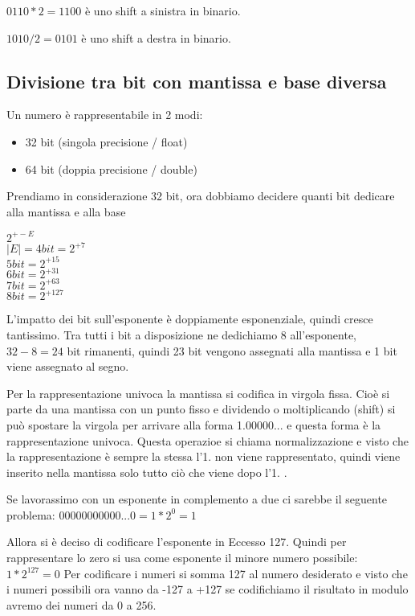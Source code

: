 \documentclass[a4paper]{article}
\theoremstyle{break}
\theoremstyle{break}
\theoremstyle{break}
\theoremstyle{break}
\theoremstyle{break}
\begin{document}
\(0110 * 2 = 1100\) è uno shift a sinistra in binario.

\(1010/2 = 0101\) è uno shift a destra in binario.

\subsection{Divisione tra bit con mantissa e base diversa}
Un numero è rappresentabile in 2 modi:
\begin{itemize}
	\item 32 bit (singola precisione / float)
	\item 64 bit (doppia precisione / double)
\end{itemize}

Prendiamo in considerazione 32 bit, ora dobbiamo decidere quanti bit dedicare alla
mantissa e alla base

$2^{+-E}$\\
$|E| = 4 bit = 2^{+7}$\\
$5 bit = 2^{+15}$\\
$6 bit = 2^{+31}$\\
$7 bit = 2^{+63}$\\
$8 bit = 2^{+127}$

L'impatto dei bit sull'esponente è doppiamente esponenziale, quindi cresce tantissimo.
Tra tutti i bit a disposizione ne dedichiamo 8 all'esponente, $32 - 8 = 24$ bit rimanenti,
quindi 23 bit vengono assegnati alla mantissa e 1 bit viene assegnato al segno.
\label{fig:disegno1}

Per la rappresentazione univoca la mantissa si codifica in virgola fissa.
Cioè si parte da una mantissa con un punto fisso e dividendo o moltiplicando (shift) si
può spostare la virgola per arrivare alla forma 1.00000... e questa forma è la
rappresentazione univoca. Questa operazioe si chiama normalizzazione e visto che la
rappresentazione è sempre la stessa l'1. non viene rappresentato, quindi
viene inserito nella mantissa solo tutto ciò che viene dopo l'1. .
\label{fig:disegno2}

Se lavorassimo con un esponente in complemento a due ci sarebbe il seguente problema:
$00000000000...0 = 1*2^{0}=1$

Allora si è deciso di codificare l'esponente in Eccesso 127. Quindi per rappresentare
lo zero si usa come esponente il minore numero possibile: $1*2^{127} = 0$
Per codificare i numeri si somma 127 al numero desiderato e visto che i numeri possibili
ora vanno da -127 a +127 se codifichiamo il risultato in modulo avremo dei numeri
da 0 a 256.
\end{document}
